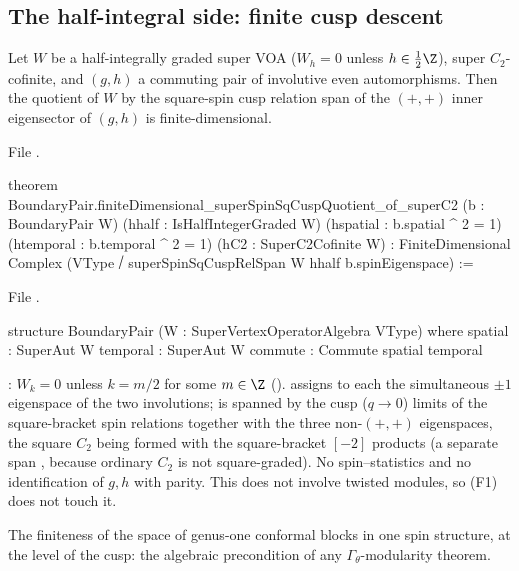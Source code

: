 \subsection{The half-integral side: finite cusp descent}

\begin{theorem}\label{l17:thm:cusp}
Let $W$ be a half-integrally graded super VOA ($W_h=0$ unless $h\in\frac12\Z$), super $C_2$-cofinite, and
$(g,h)$ a commuting pair of involutive even automorphisms. Then the quotient of $W$ by the
square-spin cusp relation span of the $(+,+)$ inner eigensector of $(g,h)$ is finite-dimensional.
\end{theorem}
\noindent File .
\begin{leancode}
theorem BoundaryPair.finiteDimensional_superSpinSqCuspQuotient_of_superC2
    (b : BoundaryPair W) (hhalf : IsHalfIntegerGraded W)
    (hspatial : b.spatial ^ 2 = 1) (htemporal : b.temporal ^ 2 = 1)
    (hC2 : SuperC2Cofinite W) :
    FiniteDimensional Complex
      (VType ⧸ superSpinSqCuspRelSpan W hhalf b.spinEigenspace) :=
\end{leancode}
\noindent File .
\begin{leancode}
structure BoundaryPair (W : SuperVertexOperatorAlgebra VType) where
  spatial : SuperAut W
  temporal : SuperAut W
  commute : Commute spatial temporal
\end{leancode}
\begin{dictionary}
: $W_k=0$ unless $k=m/2$ for some $m\in\Z$ ().
 assigns to each  the simultaneous $\pm1$ eigenspace of the two
involutions;  is spanned by the cusp ($q\to0$) limits of the square-bracket
spin relations together with the three non-$(+,+)$ eigenspaces, the square $C_2$ being formed with the
square-bracket $[-2]$ products (a separate span , because ordinary $C_2$ is not
square-graded). No spin--statistics and no identification of $g,h$ with parity. This does not involve
twisted modules, so (F1) does not touch it.
\end{dictionary}
\begin{physics}
The finiteness of the space of genus-one conformal blocks in one spin structure, at the level of the
cusp: the algebraic precondition of any $\Gamma_\theta$-modularity theorem.
\end{physics}
